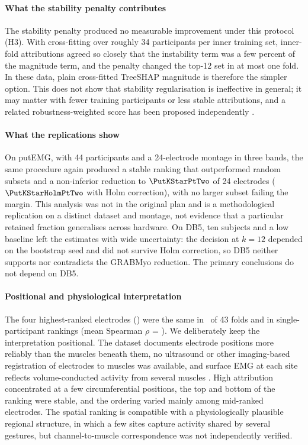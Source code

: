 \paragraph{What the stability penalty contributes}
The stability penalty produced no measurable improvement under this protocol (H3). With cross-fitting over roughly 34 participants per inner training set, inner-fold attributions agreed so closely that the instability term was a few percent of the magnitude term, and the penalty changed the top-12 set in at most one fold. In these data, plain cross-fitted TreeSHAP magnitude is therefore the simpler option. This does not show that stability regularisation is ineffective in general; it may matter with fewer training participants or less stable attributions, and a related robustness-weighted score has been proposed independently \citep{xiang2026roshap}.

\paragraph{What the replications show}
On putEMG, with 44 participants and a 24-electrode montage in three bands, the same procedure again produced a stable ranking that outperformed random subsets and a non-inferior reduction to $\PutKStarPtTwo$ of 24 electrodes ($\PutKStarHolmPtTwo$ with Holm correction), with no larger subset failing the margin. This analysis was not in the original plan and is a methodological replication on a distinct dataset and montage, not evidence that a particular retained fraction generalises across hardware. On DB5, ten subjects and a low baseline left the estimates with wide uncertainty: the decision at $k = 12$ depended on the bootstrap seed and did not survive Holm correction, so DB5 neither supports nor contradicts the GRABMyo reduction. The primary conclusions do not depend on DB5.

\paragraph{Positional and physiological interpretation}
The four highest-ranked electrodes (\TopFourSet) were the same in \TopFourFolds\ of 43 folds and in single-participant rankings (mean Spearman $\rho$ = \StabSubjRho). We deliberately keep the interpretation positional. The dataset documents electrode positions more reliably than the muscles beneath them, no ultrasound or other imaging-based registration of electrodes to muscles was available, and surface EMG at each site reflects volume-conducted activity from several muscles \citep{farina2004extraction}. High attribution concentrated at a few circumferential positions, the top and bottom of the ranking were stable, and the ordering varied mainly among mid-ranked electrodes. The spatial ranking is compatible with a physiologically plausible regional structure, in which a few sites capture activity shared by several gestures, but channel-to-muscle correspondence was not independently verified.

